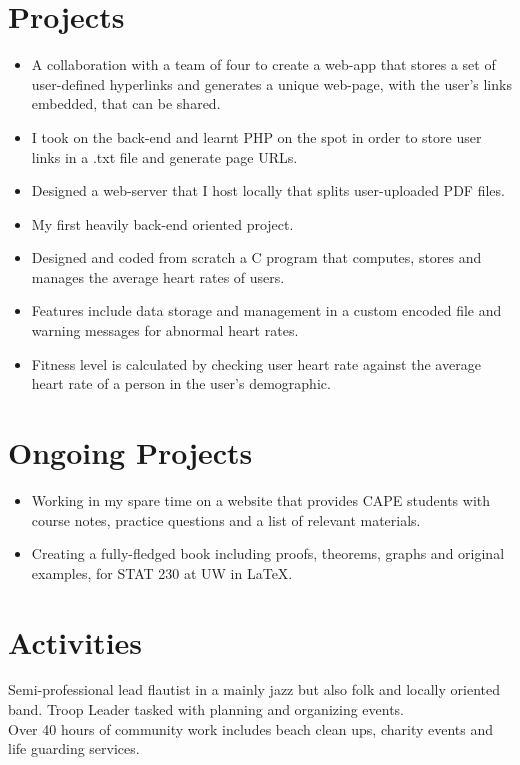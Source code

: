 \documentclass{resume}
\newcommand{\present}{$\rightarrow$}
\begin{document}
\begin{minipage}[t]{0.63\linewidth}
\section{Projects}
\begin{itemize}
    \item A collaboration with a team of four to create a web-app that stores a set of user-defined hyperlinks and generates a unique web-page, with the user's links embedded, that can be shared.
    \item I took on the back-end and learnt PHP on the spot in order to store user links in a .txt file and generate page URLs.
\end{itemize}
\begin{itemize}
    \item Designed a web-server that I host locally that splits user-uploaded PDF files.
    \item My first heavily back-end oriented project.
\end{itemize}
\begin{itemize}
    \item Designed and coded from scratch a C program that computes, stores and manages the average heart rates of users.
    \item Features include data storage and management in a custom encoded file and warning messages for abnormal heart rates.
    \item Fitness level is calculated by checking user heart rate against the average heart rate of a person in the user's demographic.
\end{itemize}

\section{Ongoing Projects}
\begin{itemize}
    \item Working in my spare time on a website that provides CAPE students with course notes, practice questions and a list of relevant materials.
\end{itemize}
\begin{itemize}
    \item Creating a fully-fledged book including proofs, theorems, graphs and original examples, for STAT 230 at UW in \LaTeX.
\end{itemize}

\section{Activities}
\lheading{2009\present}{Holistic Music School Ensemble}
Semi-professional lead flautist in a mainly jazz but also folk and locally oriented band.
Troop Leader tasked with planning and organizing events.\\
Over 40 hours of community work includes beach clean ups, charity events and life guarding services.
\end{minipage}
\end{document}
